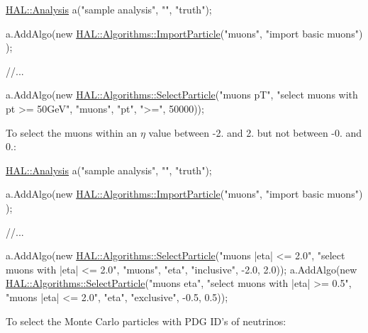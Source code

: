 \begin{DoxyCode}
\hyperlink{class_h_a_l_1_1_analysis}{HAL::Analysis} a(\textcolor{stringliteral}{"sample analysis"}, \textcolor{stringliteral}{""}, \textcolor{stringliteral}{"truth"});

a.AddAlgo(\textcolor{keyword}{new} \hyperlink{class_h_a_l_1_1_algorithms_1_1_import_particle}{HAL::Algorithms::ImportParticle}(\textcolor{stringliteral}{"muons"}, \textcolor{stringliteral}{"import basic muons"})
      );

\textcolor{comment}{//...}

a.AddAlgo(\textcolor{keyword}{new} \hyperlink{class_h_a_l_1_1_algorithms_1_1_select_particle}{HAL::Algorithms::SelectParticle}(\textcolor{stringliteral}{"muons pT"}, \textcolor{stringliteral}{"select muons with
       pt >= 50GeV"}, 
                                              \textcolor{stringliteral}{"muons"},
                                              \textcolor{stringliteral}{"pt"}, \textcolor{stringliteral}{">="}, 50000));
\end{DoxyCode}
 To select the muons within an $ \eta $ value between -\/2. and 2. but not between -\/0. and 0.\+:


\begin{DoxyCode}
\hyperlink{class_h_a_l_1_1_analysis}{HAL::Analysis} a(\textcolor{stringliteral}{"sample analysis"}, \textcolor{stringliteral}{""}, \textcolor{stringliteral}{"truth"});

a.AddAlgo(\textcolor{keyword}{new} \hyperlink{class_h_a_l_1_1_algorithms_1_1_import_particle}{HAL::Algorithms::ImportParticle}(\textcolor{stringliteral}{"muons"}, \textcolor{stringliteral}{"import basic muons"})
      );

\textcolor{comment}{//...}

a.AddAlgo(\textcolor{keyword}{new} \hyperlink{class_h_a_l_1_1_algorithms_1_1_select_particle}{HAL::Algorithms::SelectParticle}(\textcolor{stringliteral}{"muons |eta| <= 2.0"}, \textcolor{stringliteral}{"select
       muons with |eta| <= 2.0"}, 
                                              \textcolor{stringliteral}{"muons"},
                                              \textcolor{stringliteral}{"eta"}, \textcolor{stringliteral}{"inclusive"}, -2.0, 2.0));
a.AddAlgo(\textcolor{keyword}{new} \hyperlink{class_h_a_l_1_1_algorithms_1_1_select_particle}{HAL::Algorithms::SelectParticle}(\textcolor{stringliteral}{"muons eta"}, \textcolor{stringliteral}{"select muons
       with |eta| >= 0.5"}, 
                                              \textcolor{stringliteral}{"muons |eta| <= 2.0"},
                                              \textcolor{stringliteral}{"eta"}, \textcolor{stringliteral}{"exclusive"}, -0.5, 0.5));
\end{DoxyCode}
 To select the Monte Carlo particles with P\+D\+G I\+D's of neutrinos\+:


